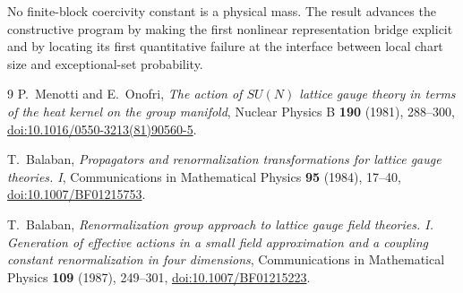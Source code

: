 \documentclass[11pt]{article}
\theoremstyle{definition}
\begin{document}
No finite-block coercivity constant is a physical mass.  The result advances
the constructive program by making the first nonlinear representation bridge
explicit and by locating its first quantitative failure at the interface
between local chart size and exceptional-set probability.

\begin{thebibliography}{9}
P.~Menotti and E.~Onofri,
\emph{The action of $SU(N)$ lattice gauge theory in terms of the heat kernel
on the group manifold}, Nuclear Physics B \textbf{190} (1981), 288--300,
\href{https://doi.org/10.1016/0550-3213(81)90560-5}{doi:10.1016/0550-3213(81)90560-5}.

T.~Balaban,
\emph{Propagators and renormalization transformations for lattice gauge
theories. I}, Communications in Mathematical Physics \textbf{95} (1984),
17--40,
\href{https://doi.org/10.1007/BF01215753}{doi:10.1007/BF01215753}.

T.~Balaban,
\emph{Renormalization group approach to lattice gauge field theories. I.
Generation of effective actions in a small field approximation and a coupling
constant renormalization in four dimensions}, Communications in Mathematical
Physics \textbf{109} (1987), 249--301,
\href{https://doi.org/10.1007/BF01215223}{doi:10.1007/BF01215223}.
\end{thebibliography}
\end{document}
